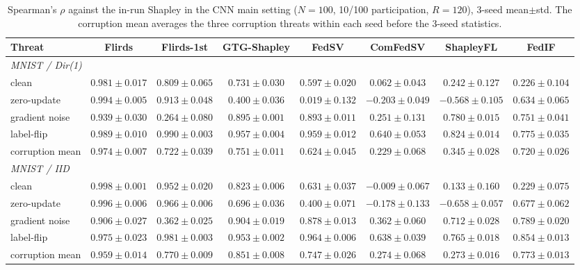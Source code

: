 \documentclass[letterpaper]{article} %
\theoremstyle{plain}
\begin{document}
\begin{table}[t]
\centering
\small
\setlength{\tabcolsep}{4pt}
\caption{Spearman's $\rho$ against the in-run Shapley in the CNN main setting
($N{=}100$, 10/100 participation, $R{=}120$), 3-seed mean$\pm$std. The
corruption mean averages the three corruption threats within each seed before
the 3-seed statistics.}
\label{tab:mnist-spearman}
\begin{tabular}{lccccccc}
\hline
Threat & Flirds & Flirds-1st & GTG-Shapley & FedSV & ComFedSV & ShapleyFL & FedIF \\
\hline
\multicolumn{8}{l}{\emph{MNIST / Dir(1)}} \\
clean & $0.981\pm0.017$ & $0.809\pm0.065$ & $0.731\pm0.030$ & $0.597\pm0.020$ & $0.062\pm0.043$ & $0.242\pm0.127$ & $0.226\pm0.104$ \\
zero-update & $0.994\pm0.005$ & $0.913\pm0.048$ & $0.400\pm0.036$ & $0.019\pm0.132$ & $-0.203\pm0.049$ & $-0.568\pm0.105$ & $0.634\pm0.065$ \\
gradient noise & $0.939\pm0.030$ & $0.264\pm0.080$ & $0.895\pm0.001$ & $0.893\pm0.011$ & $0.251\pm0.131$ & $0.780\pm0.015$ & $0.751\pm0.041$ \\
label-flip & $0.989\pm0.010$ & $0.990\pm0.003$ & $0.957\pm0.004$ & $0.959\pm0.012$ & $0.640\pm0.053$ & $0.824\pm0.014$ & $0.775\pm0.035$ \\
corruption mean & $0.974\pm0.007$ & $0.722\pm0.039$ & $0.751\pm0.011$ & $0.624\pm0.045$ & $0.229\pm0.068$ & $0.345\pm0.028$ & $0.720\pm0.026$ \\
\hline
\multicolumn{8}{l}{\emph{MNIST / IID}} \\
clean & $0.998\pm0.001$ & $0.952\pm0.020$ & $0.823\pm0.006$ & $0.631\pm0.037$ & $-0.009\pm0.067$ & $0.133\pm0.160$ & $0.229\pm0.075$ \\
zero-update & $0.996\pm0.006$ & $0.966\pm0.006$ & $0.696\pm0.036$ & $0.400\pm0.071$ & $-0.178\pm0.133$ & $-0.658\pm0.057$ & $0.677\pm0.062$ \\
gradient noise & $0.906\pm0.027$ & $0.362\pm0.025$ & $0.904\pm0.019$ & $0.878\pm0.013$ & $0.362\pm0.060$ & $0.712\pm0.028$ & $0.789\pm0.020$ \\
label-flip & $0.975\pm0.023$ & $0.981\pm0.003$ & $0.953\pm0.002$ & $0.964\pm0.006$ & $0.638\pm0.039$ & $0.765\pm0.018$ & $0.854\pm0.013$ \\
corruption mean & $0.959\pm0.014$ & $0.770\pm0.009$ & $0.851\pm0.008$ & $0.747\pm0.026$ & $0.274\pm0.068$ & $0.273\pm0.016$ & $0.773\pm0.013$ \\
\hline
\end{tabular}
\end{table}
\end{document}
